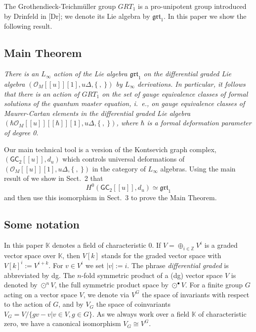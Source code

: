 \documentclass{amsart}
\theoremstyle{plain}
\theoremstyle{definition}
\begin{document}
{\smallskip}

The Grothendieck-Teichm\"uller group ${GRT_1}$ is a pro-unipotent group  introduced
by Drinfeld in [Dr]; we denote its Lie algebra by ${{\mathfrak{{grt}}}_1}$.
In this paper we show the following result.

 {\smallskip}

\subsection{ Main Theorem} {\em There is an $L_\infty$ action of the Lie algebra ${{\mathfrak{{grt}}}_1}$ on the differential graded Lie algebra $\left({{\mathcal O}}_M[[{u}]][1], {u}\Delta, \{\ ,\ \}\right)$ by $L_\infty$ derivations. In particular, it follows that there is an action of ${GRT_1}$ on the set of gauge equivalence classes of formal solutions of the quantum master equation, i.~e., on gauge equivalence classes of Maurer-Cartan elements in the differential graded Lie algebra $\left(\hbar{{\mathcal O}}_M[[{u}]][[\hbar]][1], {u}\Delta, \{\ ,\ \}\right)$, where $\hbar$ is a formal deformation parameter of degree 0. }

 {\smallskip}

 Our main technical tool is a  version of the Kontsevich graph complex, $({{\mathsf G}}{{\mathsf C}}_2[[{u}]], d_{u})$ which
 controls universal deformations of $\left({{\mathcal O}}_M[[{u}]][1], {u}\Delta, \{\ ,\ \}\right)$  in the category of $L_\infty$ algebras.
 Using the main result of \cite{Wi} we show in Sect.\ 2 that
 $$
 H^0({{\mathsf G}}{{\mathsf C}}_2[[{u}]], d_{u})\simeq{{\mathfrak{{grt}}}_1}
 $$
and then use this isomorphism in Sect.\ 3 to prove the Main Theorem.

\subsection{ Some notation} In this paper $\mathbb K$ denotes a field of characteristic $0$. If $V=\oplus_{i\in {{\mathbb Z}}} V^i$ is a graded vector space over ${{\mathbb K}}$, then
$V[k]$ stands for the graded vector space with $V[k]^i:=V^{i+k}$. For $v\in V^i$ we set $|v|:=i$.
The phrase \emph{differential graded} is abbreviated by dg.
The $n$-fold symmetric product of a (dg) vector space $V$ is denoted  by $\odot^n V$, the full symmetric product space by  $\odot^\bullet V$.
For a finite group $G$ acting on a vector space $V$, we
denote via $V^G$ the space of invariants with respect to the action of $G$, and by $V_G$
the space of coinvariants $V_G = V/\{gv- v| v\in V, g\in G\}$. As we always work over a field ${{\mathbb K}}$ of characteristic zero, we have a canonical isomorphism $V_G\cong V^G$.
\end{document}
